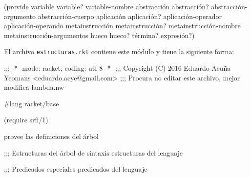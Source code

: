 \nwenddocs{}\endmoddef
(provide variable variable? variable-nombre
         abstracción abstracción? abstracción-argumento abstracción-cuerpo
         aplicación aplicación? aplicación-operador aplicación-operando
         metainstrucción metainstrucción? metainstrucción-nombre metainstrucción-argumentos
         hueco hueco?
         término? expresión?)
\nwendcode{}\nwdocspar

El archivo {\tt{}estructuras.rkt} contiene este módulo y tiene la siguiente forma:

\nwenddocs{}\endmoddef
;;; -*- mode: racket; coding: utf-8 -*-
;;; Copyright (C) 2016 Eduardo Acuña Yeomans <eduardo.acye@gmail.com>
;;; Procura no editar este archivo, mejor modifica lambda.nw

#lang racket/base

(require srfi/1)

\LA{}provee las definiciones del árbol~{\nwtagstyle{}}\RA{}

;;; Estructuras del árbol de sintaxis
\LA{}estructuras del lenguaje~{\nwtagstyle{}}\RA{}

;;; Predicados especiales
\LA{}predicados del lenguaje~{\nwtagstyle{}}\RA{}
\nwendcode{}\nwdocspar

